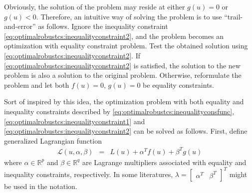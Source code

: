Obviously, the solution of the problem may reside at either $g(u)=0$ or $g(u)<0$. Therefore, an intuitive way of solving the problem is to use ``trail-and-error'' as follows. Ignore the inequality constraint \eqref{eq:optimalrobustcs:inequalityconstraint2}, and the problem becomes an optimization with equality constraint problem. Test the obtained solution using \eqref{eq:optimalrobustcs:inequalityconstraint2}. If \eqref{eq:optimalrobustcs:inequalityconstraint2} is satisfied, the solution to the new problem is also a solution to the original problem. Otherwise, reformulate the problem and let both $f(u)=0$, $g(u)=0$ be equality constraints.

Sort of inspired by this idea, the optimization problem with both equality and inequality constraints described by \eqref{eq:optimalrobustcs:inequalityconsfunc}, \eqref{eq:optimalrobustcs:inequalityconstraint1} and \eqref{eq:optimalrobustcs:inequalityconstraint2} can be solved as follows. First, define generalized Lagrangian function
\begin{eqnarray}
  \mathcal{L}(u, \alpha, \beta) &=& L(u) + \alpha^Tf(u) + \beta^Tg(u) \nonumber
\end{eqnarray}
where $\alpha\in\mathbb{R}^p$ and $\beta\in\mathbb{R}^q$ are Lagrange multipliers associated with equality and inequality constraints, respectively. In some literatures, $\lambda = \left[\begin{array}{cc}
        \alpha^T & \beta^T
      \end{array} \right]^T$ might be used in the notation.

